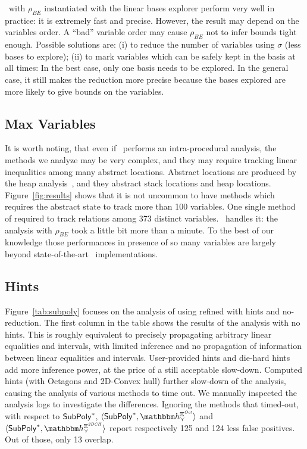 \documentclass[sttt]{svjour}
\begin{document}
\Subpoly\ with $\rho_{BE}$ instantiated with the linear bases explorer perform very well in practice: it is extremely fast and precise.
However, the result may depend on the variables order.
A ``bad'' variable order may cause  $\rho_{BE}$ not to infer bounds tight enough.
Possible solutions are: (i) to reduce the number of variables using $\sigma$ (less bases to explore);
(ii) to mark variables which can be safely kept in the basis at all times: In the best case, only one basis needs to be explored. 
In the general case, it still makes the reduction more precise because the bases explored are more likely to give bounds on the variables.

\subsection{Max Variables} 
It is worth noting, that even if \Clousot\ performs an intra-procedural analysis, the methods we analyze may be very complex, and they may require tracking linear inequalities among many abstract locations.
Abstract locations are produced by the heap analysis~\cite{Logozzo07}, and they abstract stack locations and heap locations. 
Figure~\ref{fig:results} shows that it is not uncommon to have methods which requires the abstract state to track more than 100 variables.
One single method of  required to track relations among 373 distinct variables.
\Subpoly\ handles it: the analysis with  $\rho_{BE}$ took a little bit more than a minute.
To the best of our knowledge those performances in presence of so many variables are largely beyond state-of-the-art \Polyhedra\ implementations.

\subsection{Hints}

Figure~\ref{tab:subpoly} focuses on the analysis of  using \Subpoly{} refined with hints and no-reduction.
The first column in the table shows the results of the analysis  with no hints.
This is roughly equivalent to precisely propagating arbitrary linear equalities and intervals, with limited inference and no propagation of information between linear equalities and intervals. 
User-provided hints and die-hard hints add more inference power, at the price of a still acceptable slow-down.
Computed hints (with Octagons and 2D-Convex hull) further slow-down of the analysis, causing the analysis of various methods to time out.
We manually inspected the analysis logs to investigate the differences.
Ignoring the methods that timed-out, with respect to $\mathsf{SubPoly}^*$, $\tupla{\Subpoly^*, \hint{\cjoin}^{\hintcomp^\mathit{Oct}} }$ and  $\tupla{\Subpoly^*,  \hint{\cjoin}^{\hintcomp^\mathit{2DCH}}}$ report respectively 125 and  124 less false positives. 
Out of those, only 13 overlap.
\end{document}

